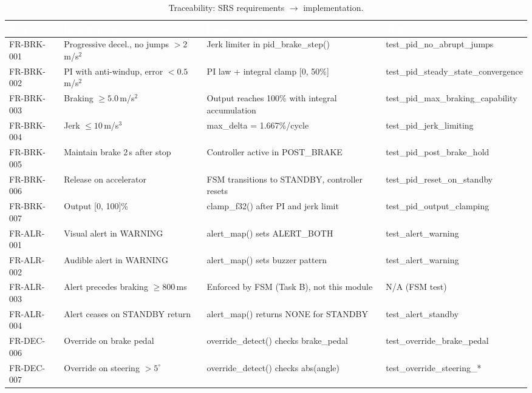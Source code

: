 \documentclass[12pt]{article}
\begin{document}
\begin{table}[H]
\centering
\caption{Traceability: SRS requirements $\to$ implementation.}
\scriptsize
\setlength{\tabcolsep}{3pt}
\begin{tabularx}{\textwidth}{|>{\raggedright\arraybackslash}p{1.5cm}
                              |>{\raggedright\arraybackslash}p{2.5cm}
                              |>{\raggedright\arraybackslash}p{3.0cm}
                              |>{\raggedright\arraybackslash}X|}
\hline
\rowcolor{sectionblue}
\textcolor{white}{\textbf{Req.}} &
\textcolor{white}{\textbf{Requirement}} &
\textcolor{white}{\textbf{Implementation}} &
\textcolor{white}{\textbf{Test}} \\ \hline

FR-BRK-001 & Progressive decel., no jumps $> 2$\,m/s$^2$ & Jerk limiter in pid\_brake\_step() & test\_pid\_no\_abrupt\_jumps \\ \hline
FR-BRK-002 & PI with anti-windup, error $< 0.5$\,m/s$^2$ & PI law + integral clamp [0, 50\%] & test\_pid\_steady\_state\_convergence \\ \hline
FR-BRK-003 & Braking $\geq 5.0$\,m/s$^2$ & Output reaches 100\% with integral accumulation & test\_pid\_max\_braking\_capability \\ \hline
FR-BRK-004 & Jerk $\leq 10$\,m/s$^3$ & max\_delta = 1.667\%/cycle & test\_pid\_jerk\_limiting \\ \hline
FR-BRK-005 & Maintain brake 2\,s after stop & Controller active in POST\_BRAKE & test\_pid\_post\_brake\_hold \\ \hline
FR-BRK-006 & Release on accelerator & FSM transitions to STANDBY, controller resets & test\_pid\_reset\_on\_standby \\ \hline
FR-BRK-007 & Output [0, 100]\% & clamp\_f32() after PI and jerk limit & test\_pid\_output\_clamping \\ \hline
FR-ALR-001 & Visual alert in WARNING & alert\_map() sets ALERT\_BOTH & test\_alert\_warning \\ \hline
FR-ALR-002 & Audible alert in WARNING & alert\_map() sets buzzer pattern & test\_alert\_warning \\ \hline
FR-ALR-003 & Alert precedes braking $\geq 800$\,ms & Enforced by FSM (Task B), not this module & N/A (FSM test) \\ \hline
FR-ALR-004 & Alert ceases on STANDBY return & alert\_map() returns NONE for STANDBY & test\_alert\_standby \\ \hline
FR-DEC-006 & Override on brake pedal & override\_detect() checks brake\_pedal & test\_override\_brake\_pedal \\ \hline
FR-DEC-007 & Override on steering $> 5^{\circ}$ & override\_detect() checks abs(angle) & test\_override\_steering\_* \\ \hline

\end{tabularx}
\end{table}
\end{document}
